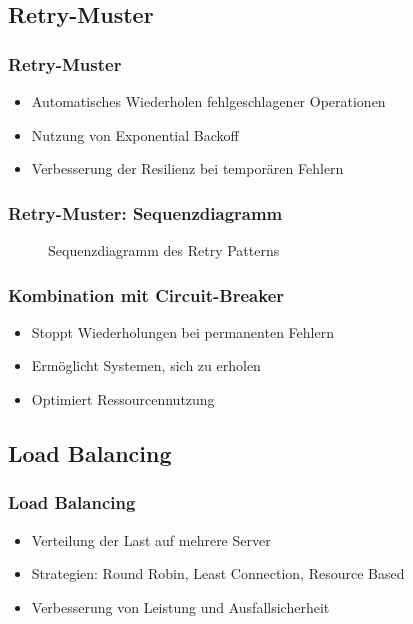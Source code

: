\subsection{Retry-Muster}

\begin{frame}
    \frametitle{Retry-Muster}
    \begin{itemize}
        \item Automatisches Wiederholen fehlgeschlagener Operationen
        \item Nutzung von Exponential Backoff
        \item Verbesserung der Resilienz bei temporären Fehlern
    \end{itemize}
\end{frame}

\begin{frame}
    \frametitle{Retry-Muster: Sequenzdiagramm}
    \begin{figure}[h]
        \caption{Sequenzdiagramm des Retry Patterns}
    \end{figure}
\end{frame}

\begin{frame}
    \frametitle{Kombination mit Circuit-Breaker}
    \begin{itemize}
        \item Stoppt Wiederholungen bei permanenten Fehlern
        \item Ermöglicht Systemen, sich zu erholen
        \item Optimiert Ressourcennutzung
    \end{itemize}
\end{frame}

\subsection{Load Balancing}

\begin{frame}
    \frametitle{Load Balancing}
    \begin{itemize}
        \item Verteilung der Last auf mehrere Server
        \item Strategien: Round Robin, Least Connection, Resource Based
        \item Verbesserung von Leistung und Ausfallsicherheit
    \end{itemize}
\end{frame}

